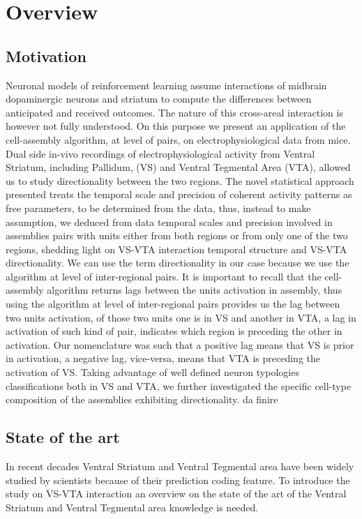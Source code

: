 \chapter{Overview}
\label{chap:MaxData}
\section{Motivation}
Neuronal models of reinforcement learning assume interactions of midbrain dopaminergic neurons and striatum to compute the differences between anticipated and received outcomes. The nature of this cross-areal interaction is however not fully understood. On this purpose we present an application of the cell-assembly algorithm, at level of pairs, on electrophysiological data from mice.
Dual side in-vivo recordings of electrophysiological activity from Ventral Striatum, including Pallidum, (VS) and Ventral Tegmental Area (VTA), allowed us to study directionality between the two regions.
The novel statistical approach presented treats the temporal scale and precision of coherent activity patterns as free parameters, to be determined from the data, thus, instead to make assumption, we deduced from data temporal scales and precision involved in assemblies pairs with units either from both regions or from only one of the two regions, shedding light on VS-VTA interaction temporal structure and VS-VTA directionality.
We can use the term directionality in our case because we use the algorithm at level of inter-regional pairs. It is important to recall that the cell-assembly algorithm returns lags between the units activation in assembly, thus using the algorithm at level of inter-regional pairs provides us the lag between two units activation, of those two units one is in VS and another in VTA, a lag in activation of such kind of pair, indicates which region is preceding the other in activation.
Our nomenclature was such that a positive lag means that VS is prior in activation, a negative lag, vice-versa, means that VTA is preceding the activation of VS.
Taking advantage of well defined neuron typologies classifications both in VS and VTA, we further investigated the specific cell-type composition of the assemblies exhibiting directionality. 
{\color{red}da finire}
\section{State of the art}
 In recent decades Ventral Striatum and Ventral Tegmental area have been widely studied by scientists because of their prediction coding feature.
 To introduce the study on VS-VTA interaction an overview on the state of the art of the Ventral Striatum and Ventral Tegmental area knowledge is needed.
